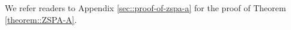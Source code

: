
\vspace{-1.4mm}

We refer readers to Appendix \ref{sec::proof-of-zspa-a} for the proof of Theorem \ref{theorem::ZSPA-A}. 






